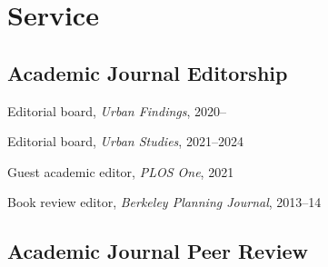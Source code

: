 \documentclass[11pt,letterpaper]{report}
\newcommand{\listitemspace}{0.25em}
\renewenvironment{itemize}
{\begin{list}{}{\setlength{\leftmargin}{0em}
                \setlength{\parskip}{0em}
                \setlength{\itemsep}{\listitemspace}
                \setlength{\parsep}{\listitemspace}}}
{\end{list}}
\begin{document}
    \section*{Service}

%
%
%

    \subsection*{Academic Journal Editorship}

    \begin{itemize}

        \item Editorial board, \textit{Urban Findings}, 2020--
        \item Editorial board, \textit{Urban Studies}, 2021--2024
        \item Guest academic editor, \textit{PLOS One}, 2021
        \item Book review editor, \textit{Berkeley Planning Journal}, 2013--14

    \end{itemize}

    \subsection*{Academic Journal Peer Review}
\end{document}
